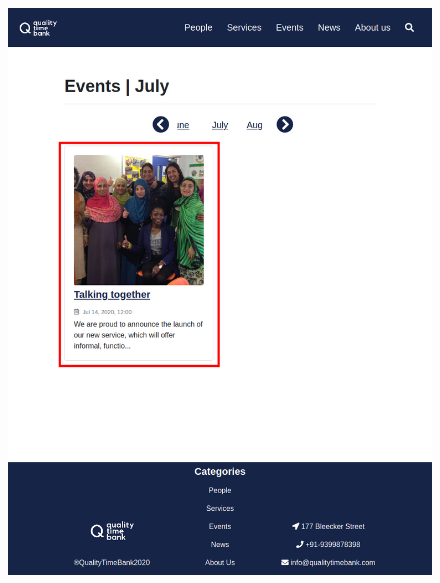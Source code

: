 \documentclass[a4paper, 11pt, parskip=half, headsepline]{scrreprt}
\begin{document}
\begin{figure}[H]
    \begin{minipage}[t]{0.5\textwidth}
        \centering
    	\includegraphics[width=1\linewidth, keepaspectratio]{scenarios/scenario-23}
    	\caption{}
    	\label{fig:scenario-23}
    \end{minipage}
    \hspace*{\fill}
    \begin{minipage}[t]{0.5\textwidth}
        \centering

\end{minipage}
\end{figure}
\end{document}
